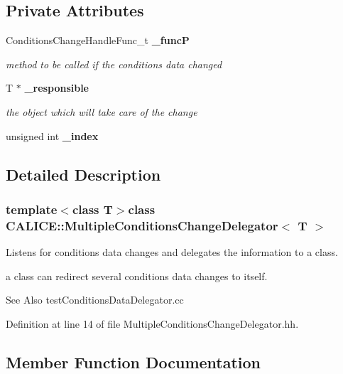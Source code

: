 \subsection*{Private Attributes}
\begin{DoxyCompactItemize}
\item 
Conditions\-Change\-Handle\-Func\-\_\-t {\bf \-\_\-func\-P}\label{classCALICE_1_1MultipleConditionsChangeDelegator_a4a645a8a5db35c8c8841a770c0a64188}

\begin{DoxyCompactList}\small\item\em method to be called if the conditions data changed \end{DoxyCompactList}\item 
T $\ast$ {\bf \-\_\-responsible}\label{classCALICE_1_1MultipleConditionsChangeDelegator_a64d4deb6c673f64dfe2c1be72543714a}

\begin{DoxyCompactList}\small\item\em the object which will take care of the change \end{DoxyCompactList}\item 
unsigned int {\bfseries \-\_\-index}\label{classCALICE_1_1MultipleConditionsChangeDelegator_a3a49a4d76e2e0f374b4c526339ac970b}

\end{DoxyCompactItemize}


\subsection{Detailed Description}
\subsubsection*{template$<$class T$>$class C\-A\-L\-I\-C\-E\-::\-Multiple\-Conditions\-Change\-Delegator$<$ T $>$}

Listens for conditions data changes and delegates the information to a class. 

a class can redirect several conditions data changes to itself. \begin{DoxySeeAlso}{See Also}
test\-Conditions\-Data\-Delegator.\-cc 
\end{DoxySeeAlso}


Definition at line 14 of file Multiple\-Conditions\-Change\-Delegator.\-hh.



\subsection{Member Function Documentation}
